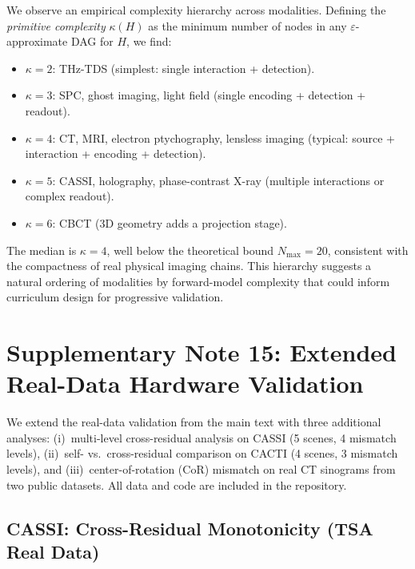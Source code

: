 \documentclass[11pt]{article}
\begin{document}
We observe an empirical complexity hierarchy across modalities.
Defining the \emph{primitive complexity} $\kappa(H)$ as the minimum
number of nodes in any $\varepsilon$-approximate DAG for $H$, we find:

\begin{itemize}
  \item $\kappa = 2$: THz-TDS (simplest: single interaction + detection).
  \item $\kappa = 3$: SPC, ghost imaging, light field (single encoding + detection + readout).
  \item $\kappa = 4$: CT, MRI, electron ptychography, lensless imaging (typical: source + interaction + encoding + detection).
  \item $\kappa = 5$: CASSI, holography, phase-contrast X-ray (multiple interactions or complex readout).
  \item $\kappa = 6$: CBCT (3D geometry adds a projection stage).
\end{itemize}

\noindent The median is $\kappa = 4$, well below the theoretical bound
$N_{\max} = 20$, consistent with the compactness of real physical imaging
chains. This hierarchy suggests a natural ordering of modalities by
forward-model complexity that could inform curriculum design for
progressive validation.


\section{Supplementary Note 15: Extended Real-Data Hardware Validation}
\label{sec:real_data_extended}

We extend the real-data validation from the main text with three additional analyses:
(i)~multi-level cross-residual analysis on CASSI (5 scenes, 4 mismatch levels),
(ii)~self- vs.\ cross-residual comparison on CACTI (4 scenes, 3 mismatch levels),
and (iii)~center-of-rotation (CoR) mismatch on real CT sinograms from two public datasets.
All data and code are included in the repository.

\subsection{CASSI: Cross-Residual Monotonicity (TSA Real Data)}
\label{sec:cassi_cross}
\end{document}

